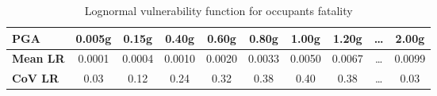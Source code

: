 \begin{table}[htbp]

\centering
\begin{tabular}{ l c c c c c c c c c }

\hline
\rowcolor{anti-flashwhite}
\bf{PGA} & \bf{0.005g} & \bf{0.15g} & \bf{0.40g} & \bf{0.60g} & \bf{0.80g} & \bf{1.00g} & \bf{1.20g} & \bf{\dots} & \bf{2.00g} \\
\hline
\bf{Mean LR} & 0.0001 & 0.0004 & 0.0010 & 0.0020 & 0.0033 & 0.0050 & 0.0067 & \dots & 0.0099 \\
\bf{CoV LR} & 0.03 & 0.12 & 0.24 & 0.32 & 0.38 & 0.40 & 0.38 & \dots & 0.03 \\
\hline
\end{tabular}

\caption{Lognormal vulnerability function for occupants fatality}
\label{tab:vf-ln-tax1-occ}
\end{table}